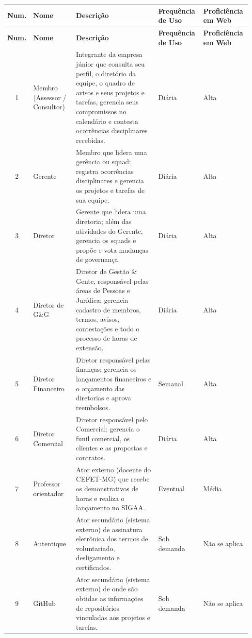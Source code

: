 \begin{center}
\footnotesize
\begin{longtable}{|c|p{2.6cm}|p{5.0cm}|p{2.1cm}|p{2.2cm}|}
\hline
\textbf{Num.} & \textbf{Nome} & \textbf{Descrição} & \textbf{Frequência de Uso} & \textbf{Proficiência em Web} \\
\hline
\endfirsthead
\hline
\textbf{Num.} & \textbf{Nome} & \textbf{Descrição} & \textbf{Frequência de Uso} & \textbf{Proficiência em Web} \\
\hline
\endhead

1 & Membro (Assessor / Consultor) & Integrante da empresa júnior que consulta seu perfil, o diretório da equipe, o quadro de avisos e seus projetos e tarefas, gerencia seus compromissos no calendário e contesta ocorrências disciplinares recebidas. & Diária & Alta \\
\hline

2 & Gerente & Membro que lidera uma gerência ou squad; registra ocorrências disciplinares e gerencia os projetos e tarefas de sua equipe. & Diária & Alta \\
\hline

3 & Diretor & Gerente que lidera uma diretoria; além das atividades do Gerente, gerencia os squads e propõe e vota mudanças de governança. & Diária & Alta \\
\hline

4 & Diretor de G\&G & Diretor de Gestão \& Gente, responsável pelas áreas de Pessoas e Jurídica; gerencia cadastro de membros, termos, avisos, contestações e todo o processo de horas de extensão. & Diária & Alta \\
\hline

5 & Diretor Financeiro & Diretor responsável pelas finanças; gerencia os lançamentos financeiros e o orçamento das diretorias e aprova reembolsos. & Semanal & Alta \\
\hline

6 & Diretor Comercial & Diretor responsável pelo Comercial; gerencia o funil comercial, os clientes e as propostas e contratos. & Diária & Alta \\
\hline

7 & Professor orientador & Ator externo (docente do CEFET-MG) que recebe os demonstrativos de horas e realiza o lançamento no SIGAA. & Eventual & Média \\
\hline

8 & Autentique & Ator secundário (sistema externo) de assinatura eletrônica dos termos de voluntariado, desligamento e certificados. & Sob demanda & Não se aplica \\
\hline

9 & GitHub & Ator secundário (sistema externo) de onde são obtidas as informações de repositórios vinculadas aos projetos e tarefas. & Sob demanda & Não se aplica \\
\hline
\end{longtable}
\end{center}

